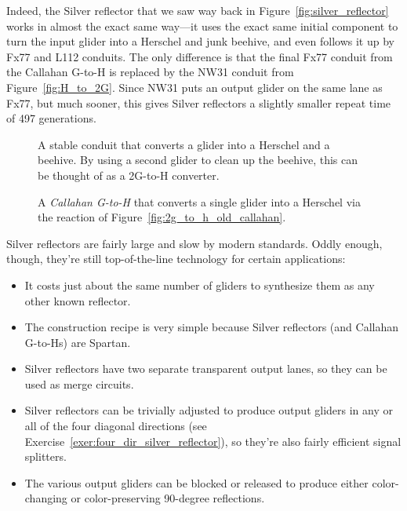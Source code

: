 Indeed, the Silver reflector that we saw way back in Figure~\ref{fig:silver_reflector} works in almost the exact same way---it uses the exact same initial component to turn the input glider into a Herschel and junk beehive, and even follows it up by Fx77 and L112 conduits. The only difference is that the final Fx77 conduit from the Callahan G-to-H is replaced by the NW31 conduit from Figure~\ref{fig:H_to_2G}. Since NW31 puts an output glider on the same lane as Fx77, but much sooner, this gives Silver reflectors a slightly smaller repeat time of 497 generations.

\begin{figure}[!htb]
	\centering
	\begin{minipage}[b]{0.43\textwidth}
		\centering
		\caption{A stable conduit that converts a glider into a Herschel and a beehive. By using a second glider to clean up the beehive, this can be thought of as a 2G-to-H converter.}\label{fig:2g_to_h_old_callahan}
	\end{minipage} \hfill \begin{minipage}[b]{0.53\textwidth}
		\centering
		\caption{A \emph{Callahan G-to-H} that converts a single glider into a Herschel via the reaction of Figure~\ref{fig:2g_to_h_old_callahan}.}\label{fig:callahan_g_to_h}
	\end{minipage}
\end{figure}

Silver reflectors are fairly large and slow by modern standards. Oddly enough, though, they're still top-of-the-line technology for certain applications:\smallskip

\begin{itemize}
	\item It costs just about the same number of gliders to synthesize them as any other known reflector.\smallskip
	
	\item The construction recipe is very simple because Silver reflectors (and Callahan G-to-Hs) are Spartan.\smallskip
	
	\item Silver reflectors have two separate transparent output lanes, so they can be used as merge circuits.\smallskip
	
	\item Silver reflectors can be trivially adjusted to produce output gliders in any or all of the four diagonal directions (see Exercise~\ref{exer:four_dir_silver_reflector}), so they're also fairly efficient signal splitters.\smallskip
	
	\item The various output gliders can be blocked or released to produce either color-changing or color-preserving 90-degree reflections.\smallskip
\end{itemize}

